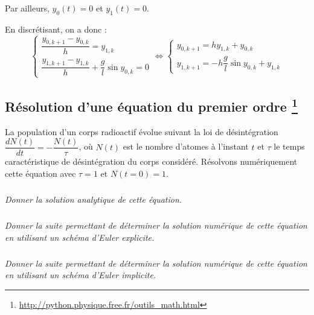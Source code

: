 \documentclass[10pt]{article}
\newif\ifprof
\begin{document}
Par ailleurs, $y_0(t) = 0 $ et $y_1(t) =0$.

En discrétisant, on a donc :
$$
\left\{
\begin{array}{l}
\dfrac{y_{0,k+1}-y_{0,k}}{h} = y_{1,k} \\
\dfrac{y_{1,k+1}-y_{1,k}}{h} + \dfrac{g}{l} \sin y_{0,k} = 0
\end{array} 
\right.
\Longleftrightarrow
\left\{
\begin{array}{l}
y_{0,k+1} = h y_{1,k} + y_{0,k}\\
y_{1,k+1} = - h \dfrac{g}{l} \sin y_{0,k}  + y_{1,k}
\end{array} 
\right.
$$
\else

\fi

\subsection*{Résolution d'une équation du premier ordre \footnote{\url{http://python.physique.free.fr/outils_math.html}}}

La population d’un corps radioactif évolue suivant la loi de désintégration $\dfrac{dN(t)}{dt}=-\dfrac{N(t)}{\tau}$, où $N(t)$ est le nombre d’atomes à l’instant $t$ et $\tau$ le temps caractéristique de désintégration du corps considéré. Résolvons numériquement cette équation avec $\tau =1$ et $N(t=0)=1$.

\subparagraph{}
\textit{Donner la solution analytique de cette équation.}
\ifprof
$$y(t)=e^{-t}$$
\else
\fi

\subparagraph{}
\textit{Donner la suite permettant de déterminer la solution numérique de cette équation en utilisant un schéma d'Euler explicite.}

\ifprof
On a $\dfrac{dN}{dt}\simeq \dfrac{N_{k+1}-N_{k}}{h}$. En conséquences, 
$$
\dfrac{N_{k+1}-N_{k}}{h} = -\dfrac{N_k}{\tau} \Longleftrightarrow 
N_{k+1} = -\dfrac{h N_k}{\tau}  + N_{k} \Longleftrightarrow 
N_{k+1} =   N_{k}\left(1-\dfrac{h}{\tau}\right)
$$
\else
\fi


\subparagraph{}
\textit{Donner la suite permettant de déterminer la solution numérique de cette équation en utilisant un schéma d'Euler implicite.}

\ifprof
On a $\dfrac{dN}{dt}\simeq \dfrac{N_{k}-N_{k-1}}{h}$. En conséquences, 
$$
\dfrac{N_{k}-N_{k-1}}{h} = -\dfrac{N_k}{\tau} \Longleftrightarrow 
N_{k}-N_{k-1} = -h \dfrac{N_k}{\tau} \Longleftrightarrow 
N_{k}\left(1+\dfrac{h}{\tau} \right) = N_{k-1} \Longleftrightarrow 
N_{k}\dfrac{\tau + h}{\tau}  = N_{k-1} \Longleftrightarrow 
N_{k}  = N_{k-1}\dfrac{\tau}{\tau + h}
$$
\else
\fi
\end{document}
